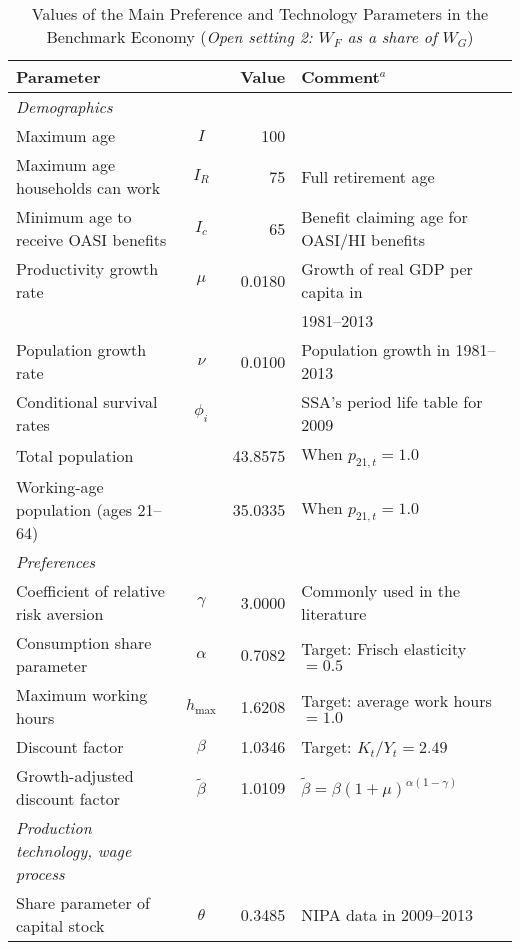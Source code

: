 \documentclass[11pt,leqno,fleqn]{article}
\begin{document}
\begin{table}[H]		
	\caption{Values of the Main Preference and Technology Parameters in the Benchmark Economy (\textit{Open setting 2: $W_F$ as a share of $W_G$})}							
	\label{T:Parameters1a}							
	\begin{center}							
		\begin{tabular*}{1.0\textwidth}{@{\extracolsep{\fill}}lcrl}							
			\hline\hline\vphantom{\rule{0pt}{12.5pt}}%
			Parameter	&		&	Value	&	Comment$^{a}$	\\
			\hline\vphantom{\rule{0pt}{12.5pt}}%
			\emph{Demographics}	&		&		&		\\
			Maximum age	&	$I$ 	&	100	&		\\
			Maximum age households can work	&	$I_R$	&	75	&	Full retirement age	\\
			Minimum age to receive OASI benefits	&	$I_c$	&	65	&	Benefit claiming age for OASI/HI benefits	\\
			Productivity growth rate	&	$\mu$	&	0.0180	&	Growth of real GDP per capita in	\\
			&		&		&	1981--2013	\\
			Population growth rate	& 	$\nu$	& 	0.0100	& 	Population growth in 1981--2013	\\
			Conditional survival rates	& 	$\phi_{i}$	& 		& 	SSA's period life table for 2009	\\
			Total population	& 		& 	43.8575	& 	When $p_{21,t}=1.0$	\\
			Working-age population (ages 21--64)	& 		& 	35.0335	& 	When $p_{21,t}=1.0$	\\
			\hline\vphantom{\rule{0pt}{12.5pt}}%
			\emph{Preferences}	&		&		&		\\
			Coefficient of relative risk aversion	& 	$\gamma$	& 	3.0000	& 	Commonly used in the literature	\\
			Consumption share parameter 	& 	$\alpha$	& 	0.7082	& 	Target: Frisch elasticity $=0.5$	\\
			Maximum working hours	&	$h_{\max}$	&	1.6208	& 	Target: average work hours $=1.0$	\\
			Discount factor	& 	$\beta $	& 	1.0346	& 	Target: $K_{t}/Y_{t}=2.49$	\\
			Growth-adjusted discount factor	& 	$\tilde{\beta} $	& 	1.0109	& 	$\tilde{\beta}=\beta(1+\mu)^{\alpha(1-\gamma)}$	\\
			\hline\vphantom{\rule{0pt}{12.5pt}}%
			\emph{Production technology, wage process}	&		&		&		\\
			Share parameter of capital stock	& 	$\theta$	& 	0.3485	& 	NIPA data in 2009--2013	\\

\end{tabular*}
\end{center}
\end{table}
\end{document}
